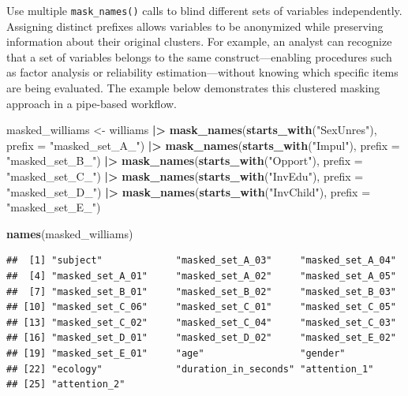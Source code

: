 \documentclass[
  english,
  man,floatsintext]{apa6}
\newenvironment{Shaded}{\begin{snugshade}}{\end{snugshade}}
\newcommand{\AttributeTok}[1]{\textcolor[rgb]{0.13,0.29,0.53}{#1}}
\newcommand{\FunctionTok}[1]{\textcolor[rgb]{0.13,0.29,0.53}{\textbf{#1}}}
\newcommand{\NormalTok}[1]{#1}
\newcommand{\OtherTok}[1]{\textcolor[rgb]{0.56,0.35,0.01}{#1}}
\newcommand{\SpecialCharTok}[1]{\textcolor[rgb]{0.81,0.36,0.00}{\textbf{#1}}}
\newcommand{\StringTok}[1]{\textcolor[rgb]{0.31,0.60,0.02}{#1}}
\begin{document}
Use multiple \texttt{mask\_names()} calls to blind different sets of variables independently. Assigning distinct prefixes allows variables to be anonymized while preserving information about their original clusters. For example, an analyst can recognize that a set of variables belongs to the same construct---enabling procedures such as factor analysis or reliability estimation---without knowing which specific items are being evaluated. The example below demonstrates this clustered masking approach in a pipe-based workflow.

\begin{Shaded}
\begin{Highlighting}[]
\NormalTok{masked\_williams }\OtherTok{\textless{}{-}} 
\NormalTok{    williams }\SpecialCharTok{|\textgreater{}} 
    \FunctionTok{mask\_names}\NormalTok{(}\FunctionTok{starts\_with}\NormalTok{(}\StringTok{"SexUnres"}\NormalTok{), }\AttributeTok{prefix =} \StringTok{"masked\_set\_A\_"}\NormalTok{) }\SpecialCharTok{|\textgreater{}}  
    \FunctionTok{mask\_names}\NormalTok{(}\FunctionTok{starts\_with}\NormalTok{(}\StringTok{"Impul"}\NormalTok{), }\AttributeTok{prefix =} \StringTok{"masked\_set\_B\_"}\NormalTok{) }\SpecialCharTok{|\textgreater{}} 
    \FunctionTok{mask\_names}\NormalTok{(}\FunctionTok{starts\_with}\NormalTok{(}\StringTok{"Opport"}\NormalTok{), }\AttributeTok{prefix =} \StringTok{"masked\_set\_C\_"}\NormalTok{) }\SpecialCharTok{|\textgreater{}} 
    \FunctionTok{mask\_names}\NormalTok{(}\FunctionTok{starts\_with}\NormalTok{(}\StringTok{"InvEdu"}\NormalTok{), }\AttributeTok{prefix =} \StringTok{"masked\_set\_D\_"}\NormalTok{) }\SpecialCharTok{|\textgreater{}} 
    \FunctionTok{mask\_names}\NormalTok{(}\FunctionTok{starts\_with}\NormalTok{(}\StringTok{"InvChild"}\NormalTok{), }\AttributeTok{prefix =} \StringTok{"masked\_set\_E\_"}\NormalTok{)}

\FunctionTok{names}\NormalTok{(masked\_williams)}
\end{Highlighting}
\end{Shaded}

\begin{verbatim}
##  [1] "subject"             "masked_set_A_03"     "masked_set_A_04"    
##  [4] "masked_set_A_01"     "masked_set_A_02"     "masked_set_A_05"    
##  [7] "masked_set_B_01"     "masked_set_B_02"     "masked_set_B_03"    
## [10] "masked_set_C_06"     "masked_set_C_01"     "masked_set_C_05"    
## [13] "masked_set_C_02"     "masked_set_C_04"     "masked_set_C_03"    
## [16] "masked_set_D_01"     "masked_set_D_02"     "masked_set_E_02"    
## [19] "masked_set_E_01"     "age"                 "gender"             
## [22] "ecology"             "duration_in_seconds" "attention_1"        
## [25] "attention_2"
\end{verbatim}
\end{document}
